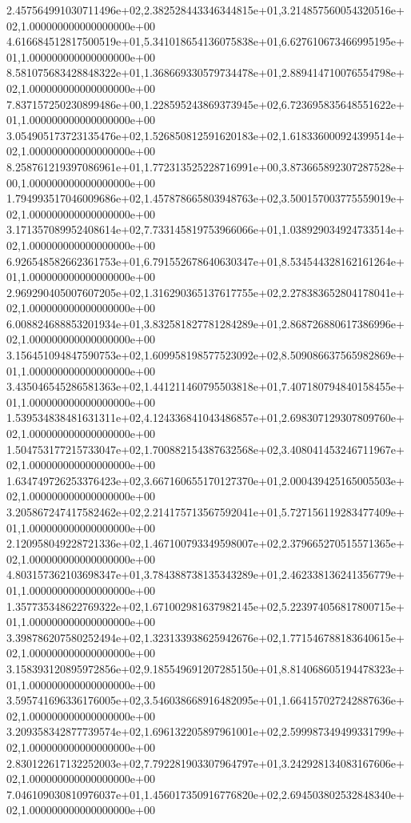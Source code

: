 2.457564991030711496e+02,2.382528443346344815e+01,3.214857560054320516e+02,1.000000000000000000e+00
4.616684512817500519e+01,5.341018654136075838e+01,6.627610673466995195e+01,1.000000000000000000e+00
8.581075683428848322e+01,1.368669330579734478e+01,2.889414710076554798e+02,1.000000000000000000e+00
7.837157250230899486e+00,1.228595243869373945e+02,6.723695835648551622e+01,1.000000000000000000e+00
3.054905173723135476e+02,1.526850812591620183e+02,1.618336000924399514e+02,1.000000000000000000e+00
8.258761219397086961e+01,1.772313525228716991e+00,3.873665892307287528e+00,1.000000000000000000e+00
1.794993517046009686e+02,1.457878665803948763e+02,3.500157003775559019e+02,1.000000000000000000e+00
3.171357089952408614e+02,7.733145819753966066e+01,1.038929034924733514e+02,1.000000000000000000e+00
6.926548582662361753e+01,6.791552678640630347e+01,8.534544328162161264e+01,1.000000000000000000e+00
2.969290405007607205e+02,1.316290365137617755e+02,2.278383652804178041e+02,1.000000000000000000e+00
6.008824688853201934e+01,3.832581827781284289e+01,2.868726880617386996e+02,1.000000000000000000e+00
3.156451094847590753e+02,1.609958198577523092e+02,8.509086637565982869e+01,1.000000000000000000e+00
3.435046545286581363e+02,1.441211460795503818e+01,7.407180794840158455e+01,1.000000000000000000e+00
1.539534838481631311e+02,4.124336841043486857e+01,2.698307129307809760e+02,1.000000000000000000e+00
1.504753177215733047e+02,1.700882154387632568e+02,3.408041453246711967e+02,1.000000000000000000e+00
1.634749726253376423e+02,3.667160655170127370e+01,2.000439425165005503e+02,1.000000000000000000e+00
3.205867247417582462e+02,2.214175713567592041e+01,5.727156119283477409e+01,1.000000000000000000e+00
2.120958049228721336e+02,1.467100793349598007e+02,2.379665270515571365e+02,1.000000000000000000e+00
4.803157362103698347e+01,3.784388738135343289e+01,2.462338136241356779e+01,1.000000000000000000e+00
1.357735348622769322e+02,1.671002981637982145e+02,5.223974056817800715e+01,1.000000000000000000e+00
3.398786207580252494e+02,1.323133938625942676e+02,1.771546788183640615e+02,1.000000000000000000e+00
3.158393120895972856e+02,9.185549691207285150e+01,8.814068605194478323e+01,1.000000000000000000e+00
3.595741696336176005e+02,3.546038668916482095e+01,1.664157027242887636e+02,1.000000000000000000e+00
3.209358342877739574e+02,1.696132205897961001e+02,2.599987349499331799e+02,1.000000000000000000e+00
2.830122617132252003e+02,7.792281903307964797e+01,3.242928134083167606e+02,1.000000000000000000e+00
7.046109030810976037e+01,1.456017350916776820e+02,2.694503802532848340e+02,1.000000000000000000e+00
